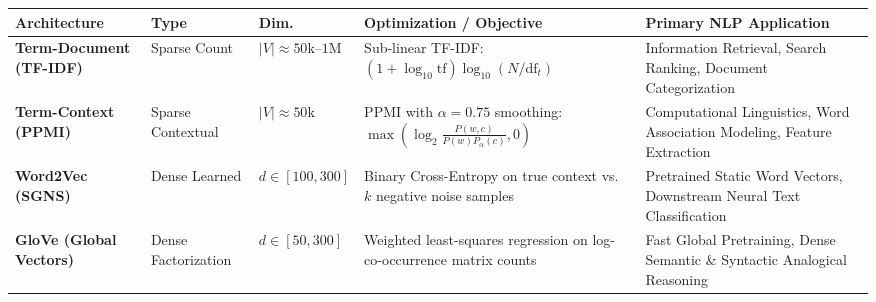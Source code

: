 \documentclass[10pt,a4paper]{article}
\begin{document}
\begin{table}[h!]
\centering
\footnotesize
\setlength{\tabcolsep}{2.5pt}
\renewcommand{\arraystretch}{1.15}
\begin{tabularx}{\linewidth}{>{\raggedright\arraybackslash}p{2.35cm} >{\raggedright\arraybackslash}p{2.0cm} >{\centering\arraybackslash}p{1.4cm} >{\raggedright\arraybackslash}X >{\raggedright\arraybackslash}X}
\toprule
\rowcolor{lightbg}
\textbf{Architecture} & \textbf{Type} & \textbf{Dim.} & \textbf{Optimization / Objective} & \textbf{Primary NLP Application} \\
\midrule
\textbf{Term-Document (TF-IDF)} & Sparse Count & $|V| \approx 50\text{k}$--$1\text{M}$ & Sub-linear TF-IDF: \newline $(1 + \log_{10} \text{tf})\log_{10}(N/\text{df}_t)$ & Information Retrieval, Search Ranking, Document Categorization \\
\midrule
\textbf{Term-Context (PPMI)} & Sparse Contextual & $|V| \approx 50\text{k}$ & PPMI with $\alpha = 0.75$ smoothing: \newline $\max(\log_2 \frac{P(w, c)}{P(w)P_\alpha(c)}, 0)$ & Computational Linguistics, Word Association Modeling, Feature Extraction \\
\midrule
\textbf{Word2Vec (SGNS)} & Dense Learned & $d \in [100, 300]$ & Binary Cross-Entropy on true context vs.\ $k$ negative noise samples & Pretrained Static Word Vectors, Downstream Neural Text Classification \\
\midrule
\textbf{GloVe (Global Vectors)} & Dense Factorization & $d \in [50, 300]$ & Weighted least-squares regression on log-co-occurrence matrix counts & Fast Global Pretraining, Dense Semantic \& Syntactic Analogical Reasoning \\
\bottomrule
\end{tabularx}
\end{table}
\end{document}
